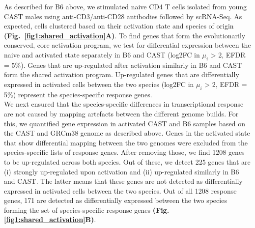 As described for B6 above, we stimulated naive CD4\plus{} T cells isolated from young CAST males using anti-CD3\textepsilon{}/anti-CD28 antibodies followed by scRNA-Seq. As expected, cells clustered based on their activation state and species of origin \textbf{(Fig.~\ref{fig1:shared_activation}A)}. To find genes that form the evolutionarily conserved, core activation program, we test for differential expression between the naive and activated state separately in B6 and CAST (log2FC in $\mu_i$ > 2, EFDR = 5\%). Genes that are up-regulated after activation similarly in B6 and CAST form the shared activation program. Up-regulated genes that are differentially expressed in activated cells between the two species (log2FC in $\mu_i$ > 2, EFDR = 5\%) represent the species-specific response genes. \\

We next ensured that the species-specific differences in transcriptional response are not caused by mapping artefacts between the different genome builds. For this, we quantified gene expression in activated CAST and B6 samples based on the CAST and GRCm38 genome as described above. Genes in the activated state that show differential mapping between the two genomes were excluded from the species-specific lists of response genes. After removing those, we find 1208 genes to be up-regulated across both species. Out of these, we detect 225 genes that are (i) strongly up-regulated upon activation and (ii) up-regulated similarly in B6 and CAST. The latter means that these genes are not detected as differentially expressed in activated cells between the two species. Out of all 1208 response genes, 171 are detected as differentially expressed between the two species forming the set of species-specific response genes \textbf{(Fig. \ref{fig1:shared_activation}B)}.

\newpage

